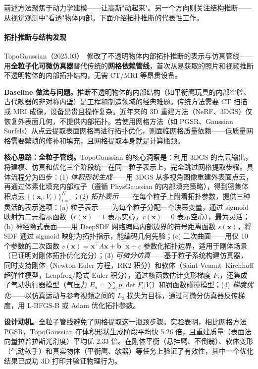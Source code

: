 前述方法聚焦于动力学建模——让高斯"动起来"。另一个方向则关注结构推断——从视觉观测中"看透"物体内部。下面介绍拓扑推断的代表性工作。

\paragraph{拓扑推断与结构发现}

TopoGaussian（2025.03）~\cite{2503_12343}修改了不透明物体内部拓扑推断的表示与仿真管线——用\textbf{全粒子化可微仿真器}替代传统的\textbf{网格依赖管线}，首次从易获取的照片和视频推断不透明物体的内部拓扑结构，无需 CT/MRI 等昂贵设备。

\textbf{Baseline 做法与问题。}推断不透明物体的内部结构（如平衡鹰玩具的内部空腔、古代欹器的非对称内壁）是工程和制造领域的经典难题。传统方法需要 CT 扫描或 MRI 成像，设备昂贵且操作复杂。近年来的 3D 重建方法（NeRF、3DGS）仅恢复外表面几何，不提供内部拓扑。若使用网格方法（如 PGSR、Gaussian Surfels）从点云提取表面网格再进行拓扑优化，则面临网格质量依赖——低质量网格需要繁琐的修补和填充，且网格提取本身就是计算瓶颈。

\textbf{核心思路：全粒子管线。}TopoGaussian 的核心洞察是：利用 3DGS 的点云输出，将建模、仿真和优化三个阶段统一在同一粒子表示上，完全跳过网格提取步骤。具体流程分为四步：(1) \emph{体积形状生成}——用 3DGS 从多视角图像重建外表面点云，再通过体素化填充内部粒子（遵循 PhysGaussian 的内部填充策略），得到密集体积点云 $\{(\mathbf{x}_i, V_i)\}_{i=1}^N$；(2) \emph{拓扑表示}——在每个粒子上附着拓扑参数，提供三种灵活的表示选项：(a) 粒子表示——为每个粒子分配一个决策变量，通过 sigmoid 映射为二元指示函数（$r(\mathbf{x})=1$ 表示实心，$r(\mathbf{x})=0$ 表示空心），最为灵活；(b) 神经隐式表面——用 DeepSDF 网络编码内部边界的符号距离函数 $s(\mathbf{x})$，将 SDF 通过 sigmoid 映射为拓扑指示，能编码几何先验；(c) 二次曲面——用仅 10 个参数的二次函数 $s(\mathbf{x}) = \mathbf{x}^\top A \mathbf{x} + \mathbf{b}^\top \mathbf{x} + c$ 参数化拓扑边界，适用于刚体场景（已证明对刚体拓扑优化充分）；(3) \emph{可微分仿真}——基于粒子系统构建仿真器，同时支持刚体（Newton-Euler 方程，RK2 积分）和软体（Saint Venant--Kirchhoff 超弹性模型，Leapfrog/隐式 Euler 积分），通过核函数估计变形梯度 $F_i$，还集成了气动执行器模型（气压力 $E_a = \sum_i p |\det F_i| V_i$）和罚函数碰撞模型；(4) \emph{梯度优化}——以仿真运动与参考视频之间的 $L_2$ 损失为目标，通过可微分仿真器反传梯度，用 L-BFGS-B 或 Adam 优化拓扑参数。

\textbf{设计动机。}全粒子管线避免了网格提取这一瓶颈步骤。实验表明，相比网格方法 PGSR，TopoGaussian 在体积形状生成阶段平均快 5.26 倍，且重建质量（表面法向量拉普拉斯光滑度）平均优 2.33 倍。在刚体平衡（悬挂鹰、不倒翁）、软体变形（气动软手）和真实物体（平衡鹰、欹器）等任务上验证了有效性，其中一个优化结果已成功 3D 打印并验证物理行为。


